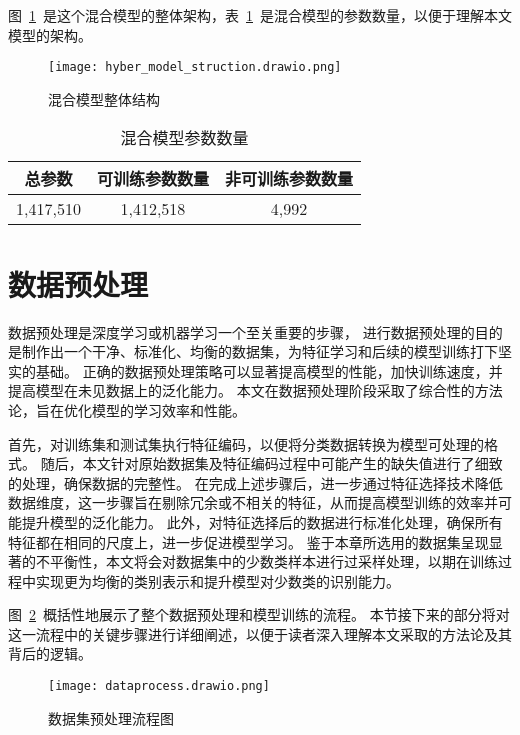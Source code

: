 图~\ref{fig:hyber_model_struct}~是这个混合模型的整体架构，表~\ref{tab:model_params}~是混合模型的参数数量，以便于理解本文模型的架构。
\begin{figure}[htbp]
  \centering
  \texttt{[image: hyber\_model\_struction.drawio.png]}
  \caption{混合模型整体结构}
  \label{fig:hyber_model_struct}
\end{figure}



\begin{table}[htbp]
  \caption{混合模型参数数量}
  \label{tab:model_params}
  \centering
  \begin{tabular}{ccc}
    \toprule
    \textbf{总参数} & \textbf{可训练参数数量} & \textbf{非可训练参数数量}\\
    \midrule
    1,417,510 & 1,412,518 & 4,992\\
    \bottomrule
  \end{tabular}
\end{table}

\section{数据预处理}
数据预处理是深度学习或机器学习一个至关重要的步骤，
进行数据预处理的目的是制作出一个干净、标准化、均衡的数据集，为特征学习和后续的模型训练打下坚实的基础。
正确的数据预处理策略可以显著提高模型的性能，加快训练速度，并提高模型在未见数据上的泛化能力。
本文在数据预处理阶段采取了综合性的方法论，旨在优化模型的学习效率和性能。\par

首先，对训练集和测试集执行特征编码，以便将分类数据转换为模型可处理的格式。
随后，本文针对原始数据集及特征编码过程中可能产生的缺失值进行了细致的处理，确保数据的完整性。
在完成上述步骤后，进一步通过特征选择技术降低数据维度，这一步骤旨在剔除冗余或不相关的特征，从而提高模型训练的效率并可能提升模型的泛化能力。
此外，对特征选择后的数据进行标准化处理，确保所有特征都在相同的尺度上，进一步促进模型学习。
鉴于本章所选用的数据集呈现显著的不平衡性，本文将会对数据集中的少数类样本进行过采样处理，以期在训练过程中实现更为均衡的类别表示和提升模型对少数类的识别能力。\par

图~\ref{fig:dataprocess}~概括性地展示了整个数据预处理和模型训练的流程。
本节接下来的部分将对这一流程中的关键步骤进行详细阐述，以便于读者深入理解本文采取的方法论及其背后的逻辑。
\begin{figure}[htbp]
  \centering
  \texttt{[image: dataprocess.drawio.png]}
  \caption{数据集预处理流程图}
  \label{fig:dataprocess}
\end{figure}

